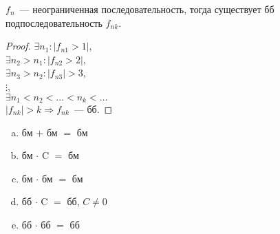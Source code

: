 \documentclass[12pt]{article}
\begin{document}
	\begin{lemma}
		$f_n$~--- неограниченная последовательность, тогда существует бб подпоследовательность $f_{nk}$.
	\end{lemma}
	\begin{proof}
		$\exists n_1: |f_{n1} > 1|$, \\
		$\exists n_2 > n_1: |f_{n2} > 2|$, \\
		$\exists n_3 > n_2: |f_{n3}| > 3$, \\
		$\vdots$, \\
		$\exists n_1 < n_2 < \dots < n_k < \dots$ \\
		$|f_{nk}| > k \Rightarrow f_{nk}$~--- бб.
	\end{proof}
	\begin{lemma}
		\begin{enumerate}[a)]
			\item бм $+$ бм $=$ бм
			\item бм $\cdot$ C $=$ бм
			\item бм $\cdot$ бм $=$ бм
			\item бб $\cdot$ C $=$ бб, $C \not= 0$
			\item бб $\cdot$ бб $=$ бб
		\end{enumerate}
	\end{lemma}
\end{document}
